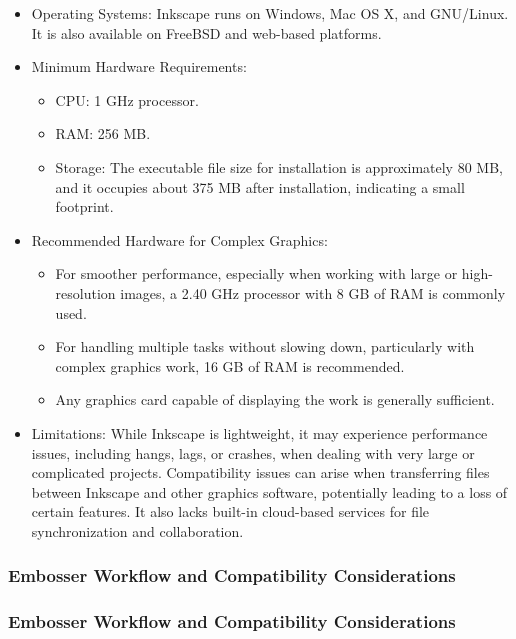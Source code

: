 \begin{itemize}
    \item Operating Systems: Inkscape runs on Windows, Mac OS X, and GNU/Linux. \cite{BlindHelpDBT} It is also available on FreeBSD and web-based platforms. \cite{BlindHelpDBT}
    \item Minimum Hardware Requirements:
    \begin{itemize}
        \item CPU: 1 GHz processor. \cite{BlindHelpDBT}
        \item RAM: 256 MB. \cite{BlindHelpDBT}
        \item Storage: The executable file size for installation is approximately 80 MB, and it occupies about 375 MB after installation, indicating a small footprint. \cite{BlindHelpDBT}
    \end{itemize}
    \item Recommended Hardware for Complex Graphics:
    \begin{itemize}
        \item For smoother performance, especially when working with large or high-resolution images, a 2.40 GHz processor with 8 GB of RAM is commonly used. \cite{BlindHelpDBT}
        \item For handling multiple tasks without slowing down, particularly with complex graphics work, 16 GB of RAM is recommended. \cite{BlindHelpDBT}
        \item Any graphics card capable of displaying the work is generally sufficient. \cite{BlindHelpDBT}
    \end{itemize}
    \item Limitations: While Inkscape is lightweight, it may experience performance issues, including hangs, lags, or crashes, when dealing with very large or complicated projects. \cite{BlindHelpDBT} Compatibility issues can arise when transferring files between Inkscape and other graphics software, potentially leading to a loss of certain features. \cite{BlindHelpDBT} It also lacks built-in cloud-based services for file synchronization and collaboration. \cite{BlindHelpDBT}
\end{itemize}

\subsubsection{Embosser Workflow and Compatibility Considerations}

\subsubsection{Embosser Workflow and Compatibility Considerations}

